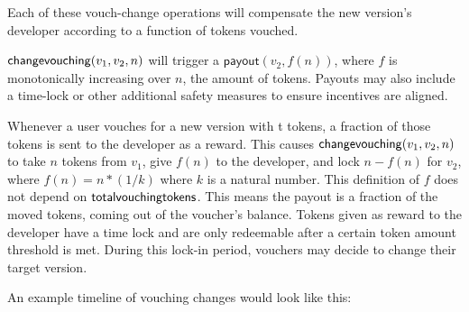 \documentclass[]{article}
\makeatletter
\let\_\relax
\DeclareRobustCommand{\_}{%
  \leavevmode\vbox{%
    \hrule\@width.5em
          \@height-.26ex
          \@depth\dimexpr.26ex+.28pt\relax}}
\makeatother
\begin{document}
Each of these vouch-change operations will compensate the new version's
developer according to a function of tokens vouched.

$\mathsf{change\_vouching}(v_1, v_2, n)$ will trigger a
$\mathsf{payout}(v_2, f(n))$, where $f$ is monotonically increasing over $n$,
the amount of tokens. Payouts may also include a time-lock or other additional
safety measures to ensure incentives are aligned.

Whenever a user vouches for a new version with t tokens, a fraction of
those tokens is sent to the developer as a reward. This causes
$\mathsf{change\_vouching}(v_1, v_2, n)$ to take $n$ tokens from $v_1$, give $f(n)$
to the developer, and lock $n - f(n)$ for $v_2$, where $f(n) = n * (1/k)$
where $k$ is a natural number. This definition of $f$ does not depend
on $\mathsf{total\_vouching\_tokens}$. This means the payout is a fraction of the
moved tokens, coming out of the voucher's balance.
Tokens given as reward to the developer have a time lock and are only
redeemable after a certain token amount threshold is met. During this lock-in
period, vouchers may decide to change their target version.

  An example timeline of vouching changes would look like this:
\end{document}
